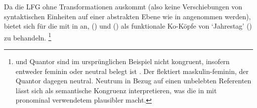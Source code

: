 
Da die LFG ohne Transformationen auskommt (also
keine Verschiebungen von syntaktischen Einheiten auf einer abstrakten Ebene wie
in  angenommen werden), bietet sich für die  mit
 in  an, 
() und  () als funktionale Ko-Köpfe von
 `Jahrestag' () zu behandeln.%
%
	\footnote{ und Quantor sind im ursprünglichen Beispiel nicht
		kongruent, insofern  entweder feminin oder neutral belegt
		ist \autocite[s.\,v.~]{lexer:mhdhwb}. Der 
		 flektiert maskulin-feminin, der Quantor 
		dagegen neutral. Neutrum in Bezug auf einen unbelebten
		Referenten lässt sich als semantische Kongruenz interpretieren, was die
		 in  mit pronominal verwendetem
		 plausibler macht.}

